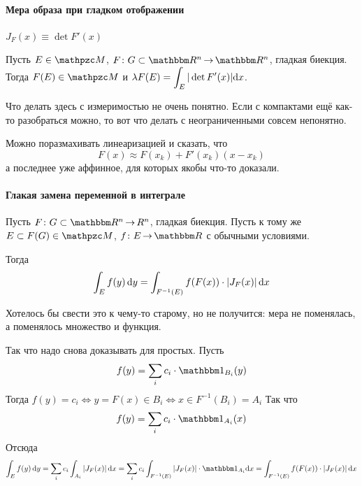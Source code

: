 \documentclass[draft, timbord]{longnotes}
\begin{document}
\paragraph{Мера образа при гладком отображении}
\label{par:meas::smoothimgmeas}

{\denot $J_F(x) \equiv \det F'(x)$}

\begin{thrm}\label{thrm:meas::smoothimgmeas}
  Пусть $E \in \lebesgue$, $F \colon G \subset \R^n \to \R^n$, гладкая биекция.
  Тогда $F(E) \in \lebesgue$ и $\lambda F(E) = \displaystyle\int_E |\det F'(x) |\mathrm{d} x$.
\end{thrm}
\begin{tproof}
  \sour\underdev
\end{tproof}
\begin{tproof}
  Что делать здесь с измеримостью не очень понятно. Если с компактами ещё как-то разобраться можно,
  то вот что делать с неограниченными совсем непонятно.

  Можно поразмахивать линеаризацией и сказать, что 
  \[
    F(x) \approx F(x_k) + F'(x_k) (x-x_k)
  \]
  а последнее уже аффинное, для которых якобы что-то доказали.
\quest
\end{tproof}

\paragraph{Глакая замена переменной в интеграле}
\label{par:meas::smoothvarch}

\begin{thrm}\label{thrm:meas::smoothvarch}
  Пусть $F \colon G \subset \R^n \to R^n$, гладкая биекция.
  Пусть к тому же $E \subset F(G) \in \lebesgue$, $f\colon E \to \R$ с обычными условиями.

  Тогда\[
    \int_E f(y) \, \mathrm{d} y = \int_{F^{-1}(E)} f(F(x)) \cdot| J_F(x) | \, \mathrm{d} x
  \]
\end{thrm}
\begin{tproof}
  Хотелось бы свести это к чему-то старому, но не получится: мера не поменялась, а поменялось
  множество и функция.

  Так что надо снова доказывать для простых. Пусть
  \[
    f(y) = \sum_i c_i \cdot \ind_{B_i}(y)
  \]
  Тогда $f(y) = c_i \Leftrightarrow y = F(x) \in B_i \Leftrightarrow x\in F^{-1}(B_i) = A_i$
  Так что 
  \[
    f(y) = \sum_i c_i \cdot \ind_{A_i}(x)
  \]
  Отсюда\[
    \int_E f(y) \, \del y = \sum_i c_i \int_{A_i} |J_F(x)|\, \del x 
    = \sum_i c_i \int_{F^{-1}(E)} |J_F(x)|\cdot \ind_{A_i} \del x
    = \int_{F^{-1}(E)} f(F(x)) \cdot|J_F(x)| \,\del x
  \]
\end{tproof}
\end{document}
